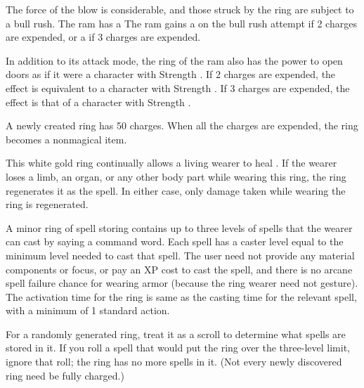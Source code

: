 The force of the blow is considerable, and those struck by the ring are subject to a bull rush. The ram has a  The ram gains a  on the bull rush attempt if 2 charges are expended, or a  if 3 charges are expended.

In addition to its attack mode, the ring of the ram also has the power to open doors as if it were a character with Strength . If 2 charges are expended, the effect is equivalent to a character with Strength . If 3 charges are expended, the effect is that of a character with Strength .

A newly created ring has 50 charges. When all the charges are expended, the ring becomes a nonmagical item.


 This white gold ring continually allows a living wearer to heal . If the wearer loses a limb, an organ, or any other body part while wearing this ring, the ring regenerates it as the spell. In either case, only damage taken while wearing the ring is regenerated.


 A minor ring of spell storing contains up to three levels of spells that the wearer can cast by saying a command word. Each spell has a caster level equal to the minimum level needed to cast that spell. The user need not provide any material components or focus, or pay an XP cost to cast the spell, and there is no arcane spell failure chance for wearing armor (because the ring wearer need not gesture). The activation time for the ring is same as the casting time for the relevant spell, with a minimum of 1 standard action.

For a randomly generated ring, treat it as a scroll to determine what spells are stored in it. If you roll a spell that would put the ring over the three-level limit, ignore that roll; the ring has no more spells in it. (Not every newly discovered ring need be fully charged.)

